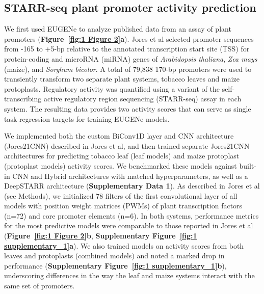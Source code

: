 \clearpage


\subsection{STARR-seq plant promoter activity prediction}

We first used EUGENe to analyze published data from an assay of plant promoters\cite{Jores2021-iu} (\textbf{Figure~\ref{fig:1 Figure 2}a}). Jores et al selected promoter sequences from -165 to +5-bp relative to the annotated transcription start site (TSS) for protein-coding and microRNA (miRNA) genes of \textit{Arabidopsis thaliana}, \textit{Zea mays} (maize), and \textit{Sorghum bicolor}. A total of 79,838 170-bp promoters were used to transiently transform two separate plant systems, tobacco leaves and maize protoplasts. Regulatory activity was quantified using a variant of the self-transcribing active regulatory region sequencing (STARR-seq) assay\cite{Jores2020-hm} in each system. The resulting data provides two activity scores that can serve as single task regression targets for training EUGENe models.

We implemented both the custom BiConv1D layer\cite{Onimaru2020-do} and CNN architecture (Jores21CNN) described in Jores et al, and then trained separate Jores21CNN architectures for predicting tobacco leaf (leaf models) and maize protoplast (protoplast models) activity scores. We benchmarked these models against built-in CNN and Hybrid architectures with matched hyperparameters, as well as a DeepSTARR architecture\cite{De_Almeida2022-aa} (\textbf{Supplementary Data 1}). As described in Jores et al (see Methods), we initialized 78 filters of the first convolutional layer of all models with position weight matrices (PWMs) of plant transcription factors (n=72) and core promoter elements (n=6)\cite{Jores2021-iu}. In both systems, performance metrics for the most predictive models were comparable to those reported in Jores et al (\textbf{Figure~\ref{fig:1 Figure 2}b}, \textbf{Supplementary Figure~\ref{fig:1 supplementary_1}a}). We also trained models on activity scores from both leaves and protoplasts (combined models) and noted a marked drop in performance (\textbf{Supplementary Figure~\ref{fig:1 supplementary_1}b}), underscoring differences in the way the leaf and maize systems interact with the same set of promoters\cite{Jores2021-iu}.


